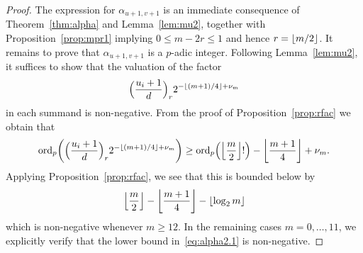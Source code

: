 \begin{proof}
The expression for $\alpha_{u+1,v+1}$ is an immediate consequence 
of Theorem~\ref{thm:alpha} and Lemma~\ref{lem:mu2}, together with 
Proposition~\ref{prop:mpr1} implying $0 \leq m - 2r \leq 1$ and 
hence $r = \left\lfloor m/2\right\rfloor$.  It remains to prove that 
$\alpha_{u+1,v+1}$ is a $p$-adic integer.  Following Lemma~\ref{lem:mu2}, 
it suffices to show that the valuation of the factor 
\begin{equation*}
\Bigl(\frac{u_i+1}{d}\Bigr)_r 2^{- \left\lfloor(m+1)/4\right\rfloor + \nu_m}
\end{equation*}
in each summand is non-negative.  From the proof of 
Proposition~\ref{prop:rfac} we obtain that 
\begin{equation} \label{eq:alpha2.1}
\operatorname{ord}_p \biggl( \Bigl(\frac{u_i+1}{d}\Bigr)_r 2^{- \left\lfloor(m+1)/4\right\rfloor + \nu_m} \biggr)
\geq \operatorname{ord}_p\Bigl(\left\lfloor\frac{m}{2}\right\rfloor!\Bigr) - \left\lfloor\frac{m+1}{4}\right\rfloor + \nu_m.
\end{equation}
Applying Proposition~\ref{prop:rfac}, we see that this is bounded 
below by 
\begin{equation*}
\left\lfloor\frac{m}{2}\right\rfloor - \left\lfloor\frac{m+1}{4}\right\rfloor - \left\lfloor\log_2 m\right\rfloor
\end{equation*}
which is non-negative whenever $m \geq 12$.  In the remaining 
cases $m = 0, \dotsc, 11$, we explicitly verify that the 
lower bound in~\eqref{eq:alpha2.1} is non-negative.
\end{proof}

